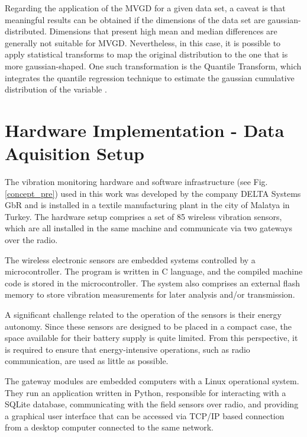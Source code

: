 \documentclass[conference]{IEEEtran}
\begin{document}
Regarding the application of the MVGD for a given data set, a caveat is that meaningful results can be obtained if the dimensions of the data set are gaussian-distributed. Dimensions that present high mean and median differences are generally not suitable for MVGD. Nevertheless, in this case, it is possible to apply statistical transforms to map the original distribution to the one that is more gaussian-shaped. One such transformation is the Quantile Transform, which integrates the quantile regression technique to estimate the gaussian cumulative distribution of the variable \cite{koenker2001quantile}.


\section{Hardware Implementation - Data Aquisition Setup}
\label{sec_implementation}

The vibration monitoring hardware and software infrastructure (see Fig. \ref{concept_pre}) used in this work was developed by the company DELTA Systems GbR and is installed in a textile manufacturing plant in the city of Malatya in Turkey. The hardware setup comprises a set of 85 wireless vibration sensors, which are all installed in the same machine and communicate via two gateways over the radio.

The wireless electronic sensors are embedded systems controlled by a microcontroller. The program is written in C language, and the compiled machine code is stored in the microcontroller. The system also comprises an external flash memory to store vibration measurements for later analysis and/or transmission. 

A significant challenge related to the operation of the sensors is their energy autonomy. Since these sensors are designed to be placed in a compact case, the space available for their battery supply is quite limited. From this perspective, it is required to ensure that energy-intensive operations, such as radio communication, are used as little as possible.

The gateway modules are embedded computers with a Linux operational system. They run an application written in Python, responsible for interacting with a SQLite database, communicating with the field sensors over radio, and providing a graphical user interface that can be accessed via TCP/IP based connection from a desktop computer connected to the same network. 
\end{document}
